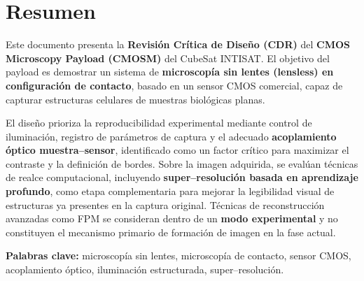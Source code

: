 \documentclass[12pt]{report}
\begin{document}
\section*{Resumen}
Este documento presenta la \textbf{Revisión Crítica de Diseño (CDR)} del
\textbf{CMOS Microscopy Payload (CMOSM)} del CubeSat INTISAT. El objetivo del
payload es demostrar un sistema de \textbf{microscopía sin lentes (lensless) en
configuración de contacto}, basado en un sensor CMOS comercial, capaz de capturar
estructuras celulares de muestras biológicas planas.

El diseño prioriza la reproducibilidad experimental mediante control de
iluminación, registro de parámetros de captura y el adecuado \textbf{acoplamiento
óptico muestra--sensor}, identificado como un factor crítico para maximizar el
contraste y la definición de bordes. Sobre la imagen adquirida, se evalúan
técnicas de realce computacional, incluyendo \textbf{super--resolución basada en
aprendizaje profundo}, como etapa complementaria para mejorar la legibilidad
visual de estructuras ya presentes en la captura original. Técnicas de
reconstrucción avanzadas como FPM se consideran dentro de un \textbf{modo
experimental} y no constituyen el mecanismo primario de formación de imagen en
la fase actual.

\vspace{0.3cm}
\noindent\textbf{Palabras clave:} microscopía sin lentes, microscopía de contacto, sensor CMOS, acoplamiento óptico, iluminación estructurada, super--resolución.

\clearpage
\tableofcontents
\clearpage

\pagestyle{fancy}










\end{document}
